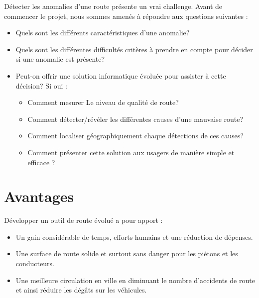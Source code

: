 Détecter les anomalies d'une route présente un vrai challenge. Avant de commencer le projet,  
 nous sommes amenés à répondre aux questions suivantes :
\begin{itemize}
  \item Quels sont les différents caractéristiques d'une anomalie?
  \item Quels sont les différentes difficultés critères à prendre en compte pour décider si une anomalie est présente?
	\item Peut-on offrir une solution informatique évoluée pour assister à cette décision? Si oui : 
        \begin{itemize}
            \item Comment mesurer Le niveau de qualité de route?
            \item Comment détecter/révéler les différentes causes d'une mauvaise route?
	      	  \item Comment localiser géographiquement chaque détections de ces causes?
	      	  \item Comment présenter cette solution aux usagers de manière simple et efficace ?
	      \end{itemize}
\end{itemize}

   \section{Avantages}
  Développer un outil de route évolué a pour apport :
    \begin{itemize}
	  \item Un gain considérable de temps, efforts humains et une réduction de dépenses.
    \item Une surface de route solide et surtout sans danger pour les piétons et les conducteurs.
    \item Une meilleure circulation en ville en diminuant le nombre d'accidents de route et ainsi réduire les dégâts sur les véhicules.
    \end{itemize}



